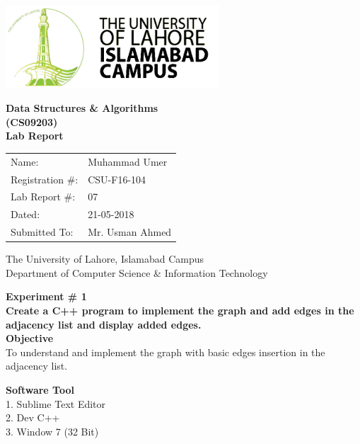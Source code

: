 \documentclass[11pt]{article}            %
\begin{document}
\begin{titlepage}
    \centering
  \vfill
    \includegraphics[width=8cm]{uni_logo.png} \\ 
	\vskip2cm
    {\bfseries\Large
	Data Structures  \& Algorithms \\ (CS09203)\\
	
	\vskip2cm
	Lab Report 
	 
	\vskip2cm
	}    

\begin{center}
\begin{tabular}{ l l  } 

Name: & Muhammad Umer \\ 
Registration \#: & CSU-F16-104 \\ 
Lab Report \#: & 07 \\ 
 Dated:& 21-05-2018\\ 
Submitted To:& Mr. Usman Ahmed\\ 

\end{tabular}
\end{center}
    \vfill
    The University of Lahore, Islamabad Campus\\
Department of Computer Science \& Information Technology
\end{titlepage}


    
    {\bfseries\Large
\centering
	Experiment \# 1 \\

Create a C++ program to implement the graph and add edges in the adjacency list and display added edges.\\
	
	}    
 \vskip1cm
 \textbf {Objective}\\  To understand and implement the graph with basic edges insertion in the adjacency list.
 
 \textbf {Software Tool} \\
1. Sublime Text Editor\\
2. Dev C++\\
3. Window 7 (32 Bit)\\
\end{document}
